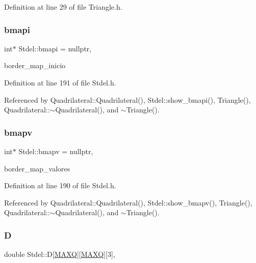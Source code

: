 Definition at line 29 of file Triangle.\+h.

\mbox{\label{classStdel_a8b082d27e5c3cab7ad2045b464af0fd9}} 
\subsubsection{\texorpdfstring{bmapi}{bmapi}}
{\footnotesize\ttfamily int$\ast$ Stdel\+::bmapi = nullptr\hspace{0.3cm}{\ttfamily [protected]}, {\ttfamily [inherited]}}



border\+\_\+map\+\_\+inicio 



Definition at line 191 of file Stdel.\+h.



Referenced by Quadrilateral\+::\+Quadrilateral(), Stdel\+::show\+\_\+bmapi(), Triangle(), Quadrilateral\+::$\sim$\+Quadrilateral(), and $\sim$\+Triangle().

\mbox{\label{classStdel_ac3cd818c98aa400279f28c22c8e0abaa}} 
\subsubsection{\texorpdfstring{bmapv}{bmapv}}
{\footnotesize\ttfamily int$\ast$ Stdel\+::bmapv = nullptr\hspace{0.3cm}{\ttfamily [protected]}, {\ttfamily [inherited]}}



border\+\_\+map\+\_\+valores 



Definition at line 190 of file Stdel.\+h.



Referenced by Quadrilateral\+::\+Quadrilateral(), Stdel\+::show\+\_\+bmapv(), Triangle(), Quadrilateral\+::$\sim$\+Quadrilateral(), and $\sim$\+Triangle().

\mbox{\label{classStdel_a61f02fa483b00cb98ff5c8d951068211}} 
\subsubsection{\texorpdfstring{D}{D}}
{\footnotesize\ttfamily double Stdel\+::D\mbox{[}\hyperlink{MyOptions_8h_af708e94d886ba3f59582612949cac702}{M\+A\+XQ}\mbox{]}\mbox{[}\hyperlink{MyOptions_8h_af708e94d886ba3f59582612949cac702}{M\+A\+XQ}\mbox{]}\mbox{[}3\mbox{]}\hspace{0.3cm}{\ttfamily [protected]}, {\ttfamily [inherited]}}

